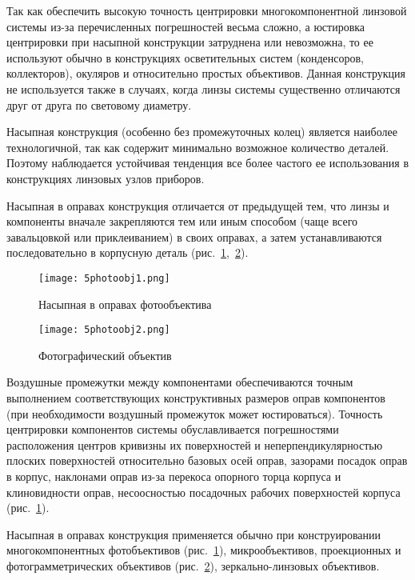 Так как обеспечить высокую точность центрировки многокомпонентной линзовой системы из-за перечисленных погрешностей весьма сложно, а юстировка центрировки при насыпной конструкции затруднена или невозможна, то ее используют обычно в конструкциях осветительных систем (конденсоров, коллекторов), окуляров и относительно простых объективов. Данная конструкция не используется также в случаях, когда линзы системы существенно отличаются друг от друга по световому диаметру.

Насыпная конструкция (особенно без промежуточных колец) является наиболее технологичной, так как содержит минимально возможное количество деталей. Поэтому наблюдается устойчивая тенденция все более частого ее использования в конструкциях линзовых узлов приборов.

Насыпная в оправах конструкция отличается от предыдущей тем, что линзы и компоненты вначале закрепляются тем или иным способом (чаще всего завальцовкой или приклеиванием) в своих оправах, а затем устанавливаются последовательно в корпусную деталь (рис.~\ref{pic:5photoobj1},~\ref{pic:5photoobj2}).

\begin{figure}[h!]
	\texttt{[image: 5photoobj1.png]}
	\caption{ Насыпная в оправах  фотообъектива }
	\label{pic:5photoobj1}
\end{figure}

\begin{figure}[h!]
	\texttt{[image: 5photoobj2.png]}
	\caption{ Фотографический  объектив }
	\label{pic:5photoobj2}
\end{figure}

Воздушные промежутки между компонентами обеспечиваются точным выполнением соответствующих конструктивных размеров оправ компонентов (при необходимости воздушный промежуток может юстироваться). Точность центрировки компонентов системы обуславливается погрешностями расположения центров кривизны их поверхностей и неперпендикулярностью плоских поверхностей относительно базовых осей оправ, зазорами посадок оправ в корпус, наклонами оправ из-за перекоса опорного торца корпуса и клиновидности оправ, несоосностью посадочных рабочих поверхностей корпуса (рис.~\ref{pic:5photoobj1}).

Насыпная в оправах конструкция применяется обычно при конструировании многокомпонентных фотобъективов (рис.~\ref{pic:5photoobj1}), микрообъективов, проекционных и фотограмметрических объективов (рис.~\ref{pic:5photoobj2}), зеркально-линзовых объективов.


